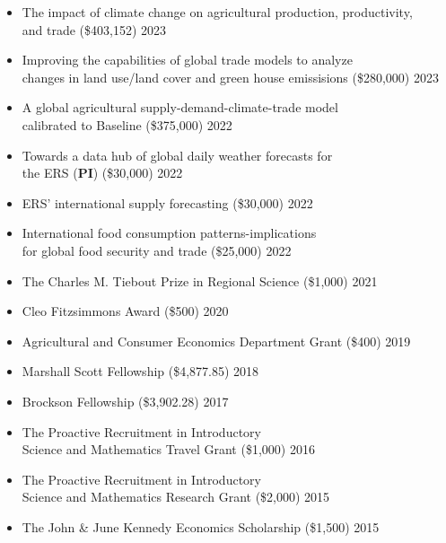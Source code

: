 \documentclass[11pt]{article}
\newenvironment{innerlist}[1][\enskip\textbullet]%
        {\begin{itemize}[#1,leftmargin=*,parsep=0pt,itemsep=0pt,topsep=0pt,partopsep=0pt]}
        {\end{itemize}}
\begin{document}
\begin{innerlist}
	\item The impact of climate change on agricultural production, productivity, \\
	and trade (\$403,152) 
	\hfill 2023
	
	\item Improving the capabilities of global trade models to analyze \\
	changes in land use/land cover and green house emissisions (\$280,000) 
	\hfill 2023
	
	\item A global agricultural supply-demand-climate-trade model \\
	calibrated to Baseline  (\$375,000) 
	\hfill 2022
	
	\item Towards a data hub of global daily weather forecasts for \\ 
	the ERS (\textbf{PI}) (\$30,000) 
	\hfill 2022%
	
	\item ERS' international supply forecasting (\$30,000)  
	\hfill 2022
	
	\item International food consumption patterns-implications \\
	for global food security and trade (\$25,000) 
	\hfill 2022
	
	\item The Charles M. Tiebout Prize in Regional Science (\$1,000) 
	\hfill 2021
	
	\item Cleo Fitzsimmons Award  (\$500) 
	\hfill 2020
	
	\item Agricultural and Consumer Economics Department Grant (\$400) 
	\hfill 2019
	
	\item Marshall Scott Fellowship (\$4,877.85) 
	\hfill 2018
	
	\item Brockson Fellowship (\$3,902.28) \hfill 2017
	
	\item The Proactive Recruitment in Introductory \\
	Science and Mathematics Travel Grant (\$1,000) 
	\hfill 2016
	
	\item The Proactive Recruitment in Introductory \\
	Science and Mathematics Research Grant (\$2,000) 
	\hfill 2015
	
	\item The John \& June Kennedy Economics Scholarship (\$1,500) 
	\hfill 2015
	
	
\end{innerlist}
\end{document}
